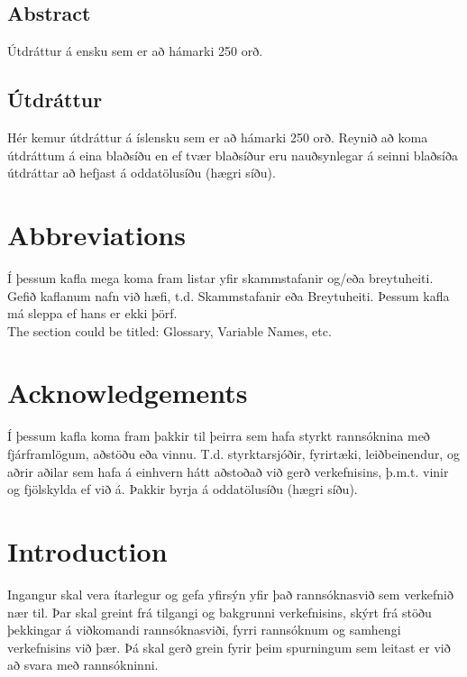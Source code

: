 \documentclass[a4paper, 12pt, twoside]{scrreprt}
\begin{document}
\setcounter{page}{5}
\section*{\huge Abstract}
Útdráttur á ensku sem er að hámarki 250 orð.
\vfill \vspace*{1cm}

\section*{\huge Útdráttur}
Hér kemur útdráttur á íslensku sem er að hámarki 250 orð. Reynið að koma útdráttum á eina blaðsíðu en ef tvær blaðsíður eru nauðsynlegar á seinni blaðsíða útdráttar að hefjast á oddatölusíðu (hægri síðu).
\vfill

\newpage

\tableofcontents
\listoffigures
\listoftables

\chapter*{Abbreviations}
Í þessum kafla mega koma fram listar yfir skammstafanir og/eða breytuheiti. Gefið kaflanum nafn við hæfi, t.d. Skammstafanir eða Breytuheiti. Þessum kafla má sleppa ef hans er ekki þörf. \\

The section could be titled: Glossary, Variable Names, etc.

\chapter*{Acknowledgements}
Í þessum kafla koma fram þakkir til þeirra sem hafa styrkt rannsóknina með fjárframlögum, aðstöðu eða vinnu. T.d. styrktarsjóðir, fyrirtæki, leiðbeinendur, og aðrir aðilar sem hafa á einhvern hátt aðstoðað við gerð verkefnisins, þ.m.t. vinir og fjölskylda ef við á. Þakkir byrja á oddatölusíðu (hægri síðu).

\clearpage
\chapter{Introduction}
\setcounter{page}{1}
Ingangur skal vera ítarlegur og gefa yfirsýn yfir það rannsóknasvið sem verkefnið nær til. Þar skal greint frá tilgangi og bakgrunni verkefnisins, skýrt frá stöðu þekkingar á viðkomandi rannsóknasviði, fyrri rannsóknum og samhengi verkefnisins við þær. Þá skal gerð grein fyrir þeim spurningum sem leitast er við að svara með rannsókninni.
\end{document}
